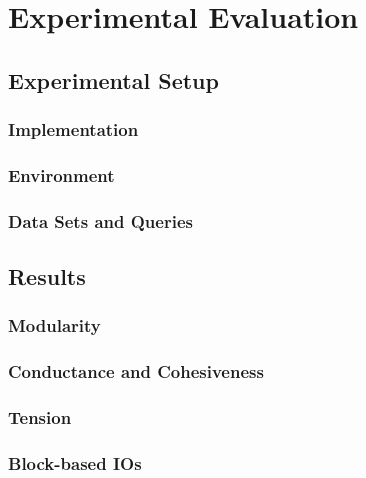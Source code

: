 \chapter{Experimental Evaluation}\label{\positionnumber} 

\section{Experimental Setup}\label{\positionnumber}
    \subsection{Implementation}\label{\positionnumber}
    \subsection{Environment}\label{\positionnumber}
    \subsection{Data Sets and Queries}\label{\positionnumber}

\section{Results}\label{\positionnumber}
    \subsection{Modularity}\label{\positionnumber}

    \subsection{Conductance and Cohesiveness}\label{\positionnumber}
    
    \subsection{Tension}\label{\positionnumber}
    
    \subsection{Block-based IOs}\label{\positionnumber}
